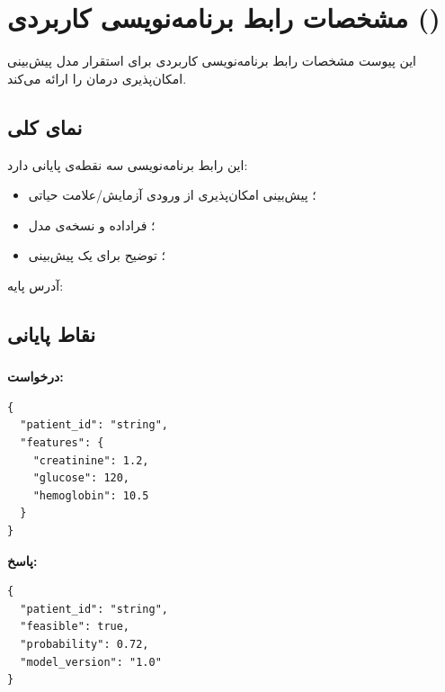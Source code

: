\chapter{\texorpdfstring{مشخصات رابط برنامه‌نویسی کاربردی ()}{مشخصات رابط برنامه‌نویسی کاربردی (API)}}
\label{app:api}

این پیوست مشخصات رابط برنامه‌نویسی کاربردی  برای استقرار مدل پیش‌بینی امکان‌پذیری درمان را ارائه می‌کند.

\section{نمای کلی}

این رابط برنامه‌نویسی سه نقطه‌ی پایانی دارد:
\begin{itemize}
\item \texttt{}؛ پیش‌بینی امکان‌پذیری از ورودی آزمایش/علامت حیاتی
\item \texttt{}؛ فراداده و نسخه‌ی مدل
\item \texttt{}؛ توضیح  برای یک پیش‌بینی
\end{itemize}

آدرس پایه: \texttt{}

\section{نقاط پایانی}

\subsection{\texttt{}}

\textbf{درخواست:}
\begin{latin}\begin{lstlisting}
{
  "patient_id": "string",
  "features": {
    "creatinine": 1.2,
    "glucose": 120,
    "hemoglobin": 10.5
  }
}
\end{lstlisting}\end{latin}

\textbf{پاسخ:}
\begin{latin}\begin{lstlisting}
{
  "patient_id": "string",
  "feasible": true,
  "probability": 0.72,
  "model_version": "1.0"
}
\end{lstlisting}\end{latin}

